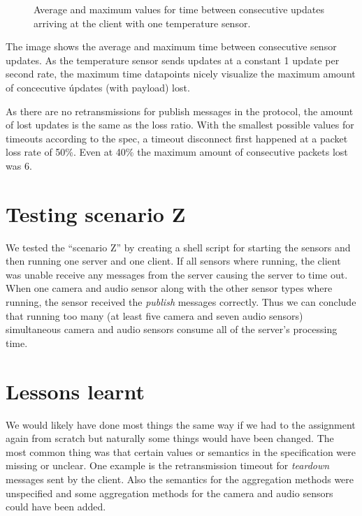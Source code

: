\documentclass[a4paper]{article}
\begin{document}
\begin{figure}
\caption{Average and maximum values for time between consecutive updates arriving at the client with one temperature sensor.} \label{fig:lossdata}
\end{figure}

The image shows the average and maximum time between consecutive sensor updates. As the temperature sensor sends updates at a constant 1 update per second rate, the maximum time datapoints nicely visualize the maximum amount of concecutive úpdates (with payload) lost.

As there are no retransmissions for publish messages in the protocol, the amount of lost updates is the same as the loss ratio. With the smallest possible values for timeouts according to the spec, a timeout disconnect first happened at a packet loss rate of 50\%. Even at 40\% the maximum amount of consecutive packets lost was 6.

\section{Testing scenario Z}
We tested the ``scenario Z'' by creating a shell script
for starting the sensors and then running one server and one client. If all
sensors where running, the client was unable receive any messages from the
server causing the server to time out. When one camera and audio sensor along
with the other sensor types where running, the sensor received the \emph{publish}
messages correctly. Thus we can conclude that running too many (at least five
camera and seven audio sensors) simultaneous camera and audio sensors consume
all of the server's processing time.

\section{Lessons learnt}
We would likely have done most things the same way if we had to the assignment
again from scratch but naturally some things would have been changed. The most
common thing was that certain values or semantics in the specification were
missing or unclear. One example is the retransmission timeout for \emph{teardown}
messages sent by the client. Also the semantics for the aggregation methods
were unspecified and some aggregation methods for the camera and audio sensors
could have been added. 

\end{document}
